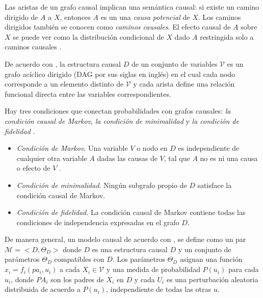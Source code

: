 Las aristas de un grafo causal implican una semántica causal: si existe un camino dirigido de $A$ a $X$, entonces $A$ es un una \textit{causa potencial} de $X$. Los caminos dirigidos también se conocen como \textit{caminos causales}. El efecto causal de $A$ sobre $X$ se puede ver como la distribución condicional de $X$ dado $A$ restringida solo a caminos causales \cite{dasgupta2019causal}.

De acuerdo con \cite{pearl_2009}, la estructura causal $D$ de un conjunto de variables $\mathcal{V}$ es un grafo acíclico dirigido (DAG por sus siglas en inglés) en el cual cada nodo corresponde a un elemento distinto de $\mathcal{V}$ y cada arista define una relación funcional directa entre las
variables correspondientes. 

Hay tres condiciones que conectan probabilidades con
grafos causales: \textit{la condición causal de Markov}, \textit{la condición de minimalidad} y \textit{la condición
de fidelidad} \cite{gonzalez-soto, spirtes2000causation}.

\begin{itemize}
    \item \textit{Condición de Markov}. Una variable $V$ o nodo
    en $D$ es independiente de cualquier otra variable $A$ dadas las causas de $V$, tal que $A$ no es ni una causa o efecto de $V$ .
    \item \textit{Condición de minimalidad}. Ningún subgrafo propio de $D$ satisface la condición causal de Markov.
    \item \textit{Condición de fidelidad}. La condición causal de Markov contiene todas las condiciones de independencia expresadas en el grafo $D$.
\end{itemize}

De manera general, un modelo causal de acuerdo con \cite{pearl_2009}, se define como un par $\mathcal{M} = <D, \Theta_D>$ donde $D$
es una estructura causal 
$D$ y un conjunto de 
parámetros $\Theta_D$ compatibles con $D$. Los 
parámetros $\Theta_D$ asignan una función $x_i = f_i (pa_i, u_i)$ a cada $X_i \in\mathcal{V}$
y una medida de  probabilidad  $P(u_i)$ para cada $u_i$, donde $PA_i$ son 
los padres de $X_i$ en $D$ y cada $U_i$ es una perturbación aleatoria distribuida
de acuerdo a $P(u_i)$, independiente de todas las otras $u$.


